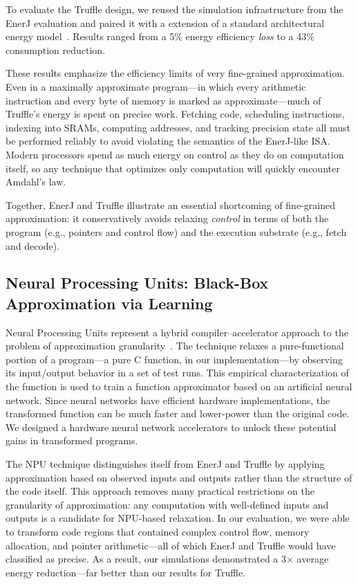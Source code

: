 To evaluate the Truffle design,
we reused the simulation infrastructure from the EnerJ evaluation and paired
it with a extension of a standard architectural energy model~\cite{mcpat}.
Results ranged from a 5\% energy efficiency \emph{loss} to a 43\%
consumption reduction.

These results emphasize the efficiency limits of very fine-grained
approximation. Even in a maximally approximate program---in which every
arithmetic instruction and every byte of memory is marked as
approximate---much of Truffle's energy is spent on precise work. Fetching
code, scheduling instructions, indexing into SRAMs, computing addresses, and
tracking precision state all must be performed reliably to avoid violating
the semantics of the EnerJ-like ISA.
Modern processors spend as much energy on
control as they do on computation itself, so any technique that optimizes only
computation will quickly encounter Amdahl's law.

Together, EnerJ and Truffle illustrate an essential shortcoming of
fine-grained approximation: it conservatively avoids relaxing \emph{control}
in terms of both the program (e.g., pointers and control flow) and the
execution substrate (e.g., fetch and decode).

\subsection{Neural Processing Units: Black-Box Approximation via Learning}

Neural Processing Units represent a hybrid compiler--accelerator approach to
the problem of approximation granularity~\cite{npu}. The technique relaxes a
pure-functional portion of a program---a pure C function, in our
implementation---by observing its input/output behavior in a set of test runs.
This empirical characterization of the function is used to train a function
approximator based on an artificial neural network. Since neural networks have
efficient hardware implementations, the transformed function can be much
faster and lower-power than the original code. We designed a hardware neural
network accelerators to unlock these potential gains in transformed programs.

The NPU technique distinguishes itself from EnerJ and Truffle by applying
approximation based on observed inputs and outputs rather than the structure
of the code itself. This approach removes many practical restrictions on the
granularity of approximation: any computation with well-defined inputs and
outputs is a candidate for NPU-based relaxation. In our evaluation, we were
able to transform code regions that contained complex control flow, memory
allocation, and pointer arithmetic---all of which EnerJ and Truffle would have
classified as precise. As a result, our simulations demonstrated a 3$\times$
average energy reduction---far better than our results for Truffle.

